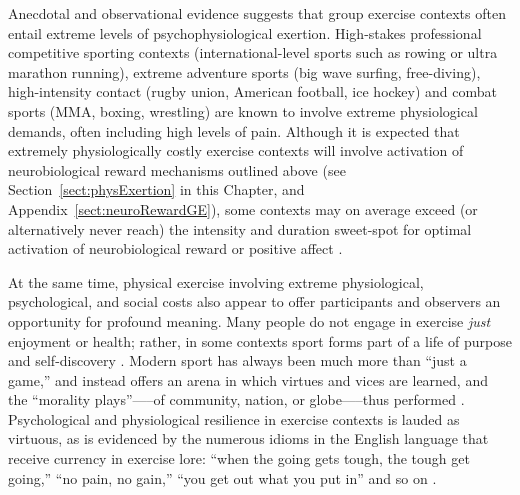 \begin{CJK}{UTF8}{gbsn}

Anecdotal and observational evidence suggests that group exercise contexts often entail extreme levels of psychophysiological exertion.  High-stakes professional competitive sporting contexts (international-level sports such as rowing or ultra marathon running), extreme adventure sports (big wave surfing, free-diving), high-intensity contact (rugby union, American football, ice hockey) and combat sports (MMA, boxing, wrestling) are known to involve extreme physiological demands, often including high levels of pain.  Although it is expected that extremely physiologically costly exercise contexts will involve activation of neurobiological reward mechanisms outlined above (see Section~\ref{sect:physExertion} in this Chapter, and Appendix~\ref{sect:neuroRewardGE}), some contexts may on average exceed (or alternatively never reach) the intensity and duration sweet-spot for optimal activation of neurobiological reward \citep{Raichlen2013} or positive affect \citep{Ekkekakis2011,Reed2006}.

At the same time, physical exercise involving extreme physiological, psychological, and social costs also appear to offer participants and observers an opportunity for profound meaning.  Many people do not engage in exercise \textit{just} enjoyment or health; rather, in some contexts sport forms part of a life of purpose and self-discovery \citep[see, for example][]{Jackson1995,Jones2004,White2011}.  Modern sport has always been much more than ``just a game,'' and instead offers an arena in which virtues and vices are learned, and the ``morality plays''—--of community, nation, or globe—--thus performed \citep{Elias1986,McNamee2008}.  Psychological and physiological resilience in exercise contexts is lauded as virtuous, as is evidenced by the numerous idioms in the English language that receive currency in exercise lore: ``when the going gets tough, the tough get going,'' ``no pain, no gain,'' ``you get out what you put in'' and so on \citep{Sarkar2014}.


\end{CJK}
